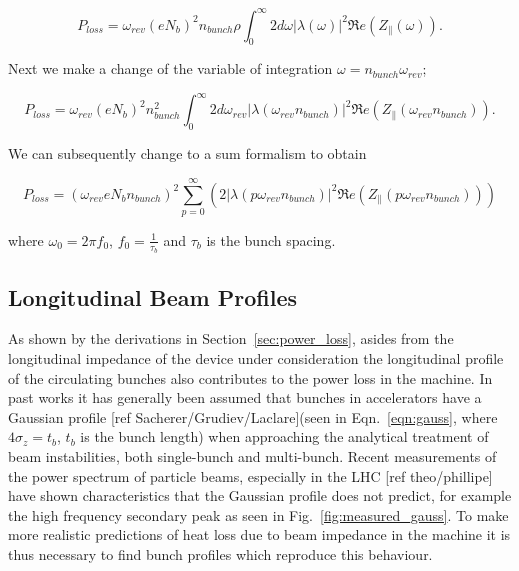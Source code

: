 \begin{equation}
P_{loss}   =  \omega_{rev} \left( eN_{b}   \right)^{2}n_{bunch}\rho \int^{\infty}_{0} 2 d\omega \left| \lambda \left( \omega \right)  \right| ^{2}  \Re{}e \left( Z_{\parallel} \left( \omega\right)  \right).
\end{equation}

Next we make a change of the variable of integration $\omega = n_{bunch}\omega_{rev}$;

\begin{equation}
P_{loss}   =  \omega_{rev} \left( eN_{b}   \right)^{2}n_{bunch}^{2} \int^{\infty}_{0} 2 d\omega_{rev} \left| \lambda \left( \omega_{rev}n_{bunch} \right)  \right|^{2}  \Re{}e \left( Z_{\parallel} \left( \omega_{rev}n_{bunch}\right)  \right).
\end{equation}

We can subsequently change to a sum formalism to obtain

\begin{equation}
P_{loss} = \left( \omega_{rev}eN_{b}n_{bunch}  \right)^{2} \displaystyle\sum\limits_{p = 0}^{\infty} \left( 2 \left| \lambda \left(p \omega_{rev}n_{bunch} \right)  \right|^{2}  \Re{}e \left( Z_{\parallel} \left(p \omega_{rev}n_{bunch}\right) \right) \right) \label{ean:heating-gen}
\end{equation}

where $\omega_{0} = 2\pi f_{0}$, $f_{0} = \frac{1}{\tau_{b}}$ and $\tau_{b}$ is the bunch spacing.

\subsection{Longitudinal Beam Profiles}

As shown by the derivations in Section~\ref{sec:power_loss}, asides from the longitudinal impedance of the device under consideration the longitudinal profile of the circulating bunches also contributes to the power loss in the machine. In past works it has generally been assumed that bunches in accelerators have a Gaussian profile [ref Sacherer/Grudiev/Laclare](seen in Eqn.~\ref{eqn:gauss}, where $4\sigma_{z} = t_{b}$, $t_{b}$ is the bunch length) when approaching the analytical treatment of beam instabilities, both single-bunch and multi-bunch. Recent measurements of the power spectrum of particle beams, especially in the LHC [ref theo/phillipe] have shown characteristics that the Gaussian profile does not predict, for example the high frequency secondary peak as seen in Fig.~\ref{fig:measured_gauss}. To make more realistic predictions of heat loss due to beam impedance in the machine it is thus necessary to find bunch profiles which reproduce this behaviour.

